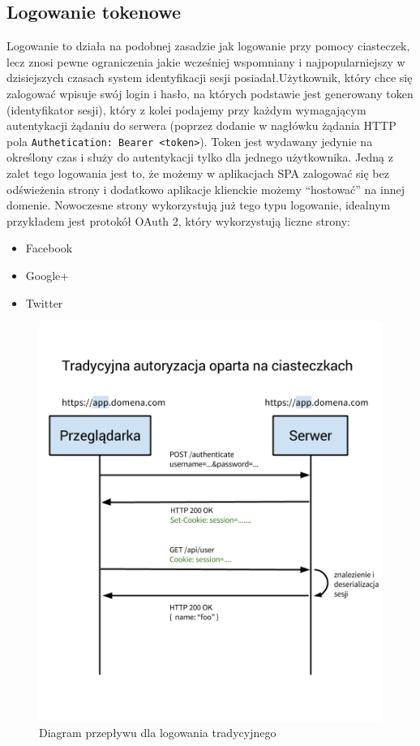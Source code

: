 \documentclass[10pt,titlepage]{article}
\begin{document}
\subsection{Logowanie tokenowe}
Logowanie to działa na podobnej zasadzie jak logowanie przy pomocy ciasteczek, lecz znosi pewne ograniczenia jakie wcześniej wspomniany i najpopularniejszy w dzisiejszych czasach system identyfikacji sesji posiadał.Użytkownik, który chce się zalogować wpisuje swój login i hasło, na których podstawie jest generowany token (identyfikator sesji), który z kolei podajemy przy każdym wymagającym autentykacji żądaniu do serwera (poprzez dodanie w nagłówku żądania HTTP pola \verb|Authetication: Bearer <token>|). Token jest wydawany jedynie na określony czas i służy do autentykacji tylko dla jednego użytkownika. Jedną z zalet tego logowania jest to, że możemy \linebreak w aplikacjach SPA zalogować się bez odświeżenia strony i dodatkowo aplikacje klienckie możemy ``hostować'' na innej domenie. Nowoczesne strony wykorzystują już tego typu logowanie, idealnym przykładem jest protokół OAuth 2, który wykorzystują liczne strony:
\begin{itemize}
  \item Facebook
  \item Google+
  \item Twitter
\end{itemize}
\begin{figure}[htbp]
  \centering
  \includegraphics[scale=0.5]{images/tokenAuth1.png}
  \caption{Diagram przepływu dla logowania tradycyjnego}
\end{figure}
\end{document}

